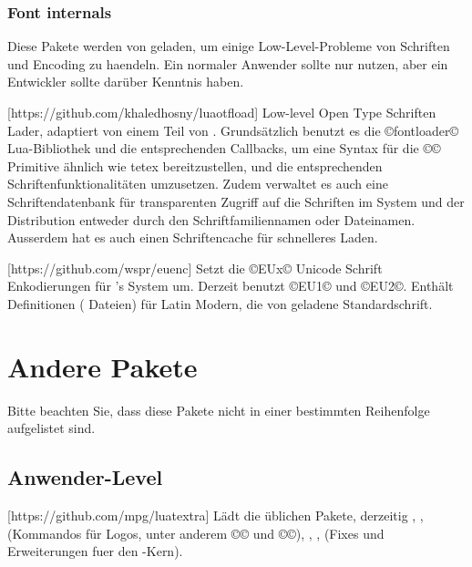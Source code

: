 \documentclass{lltxdoc}
\begin{document}
\subsubsection{Font internals}\label{fontint}

Diese Pakete werden von  geladen, um einige Low-Level-Probleme von 
Schriften und Encoding zu haendeln. Ein normaler Anwender sollte nur 
 nutzen, aber ein Entwickler sollte darüber Kenntnis haben.

[https://github.com/khaledhosny/luaotfload]
Low-level Open Type Schriften Lader, adaptiert von einem Teil von \context. 
Grundsätzlich benutzt es die ©fontloader© Lua-Bibliothek und die entsprechenden 
Callbacks, um eine Syntax für die ©\font© Primitive ähnlich wie tetex
bereitzustellen, und die entsprechenden Schriftenfunktionalitäten umzusetzen.
 Zudem verwaltet es auch eine Schriftendatenbank für transparenten Zugriff auf 
die Schriften im System und der \tex Distribution entweder durch den 
Schriftfamiliennamen oder Dateinamen. Ausserdem hat es auch einen Schriftencache
 für schnelleres Laden.

[https://github.com/wspr/euenc]
Setzt die ©EUx© Unicode Schrift Enkodierungen für \latex's  System 
um.
Derzeit benutzt \xelatex ©EU1© und \luatex ©EU2©. Enthält Definitionen 
( Dateien) für Latin Modern, die von  geladene 
Standardschrift.


\section{Andere Pakete}\label{other}

Bitte beachten Sie, dass diese Pakete nicht in einer bestimmten Reihenfolge 
aufgelistet sind.

\subsection{Anwender-Level}

[https://github.com/mpg/luatextra]
Lädt die üblichen Pakete, derzeitig , , 
(Kommandos für Logos, unter anderem ©\LuaTeX© und ©\LuaLaTeX©), ,
,  (Fixes und Erweiterungen fuer den \latex-Kern).
\end{document}
